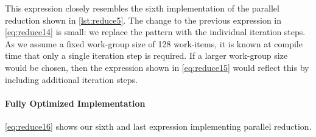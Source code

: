 %
This expression closely resembles the sixth implementation of the parallel reduction shown in \autoref{lst:reduce5}.
The change to the previous expression in \autoref{eq:reduce14} is small:
we replace the \iterateN pattern with the individual iteration steps.
As we assume a fixed work-group size of 128 work-items, it is known at compile time that only a single iteration step is required.
If a larger work-group size would be chosen, then the expression shown in \autoref{eq:reduce15} would reflect this by including additional iteration steps.




\paragraph{Fully Optimized Implementation}
\autoref{eq:reduce16} shows our sixth and last expression implementing parallel reduction.
